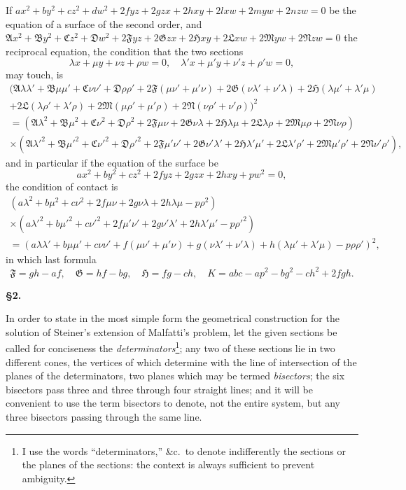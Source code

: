 \documentclass[11pt,a4paper]{book}
\begin{document}
If $ax^2+by^2+cz^2+dw^2+2fyz+2gzx+2hxy+2lxw+2myw+2nzw=0$ be the equation of a surface of the second order, and $\mathfrak{A}x^2+\mathfrak{B}y^2+\mathfrak{C}z^2+\mathfrak{D}w^2+2\mathfrak{F}yz+2\mathfrak{G}zx+2\mathfrak{H}xy+2\mathfrak{L}xw+2\mathfrak{M}yw+2\mathfrak{N}zw=0$ the reciprocal equation, the condition that the two sections
\[
\lambda x + \mu y + \nu z + \rho w = 0, \quad \lambda' x + \mu' y + \nu' z + \rho' w = 0,
\]
may touch, is
\begin{multline*}
(\mathfrak{A}\lambda\lambda' + \mathfrak{B}\mu\mu' + \mathfrak{C}\nu\nu' + \mathfrak{D}\rho\rho' + 2\mathfrak{F}(\mu\nu'+\mu'\nu) + 2\mathfrak{G}(\nu\lambda'+\nu'\lambda) + 2\mathfrak{H}(\lambda\mu'+\lambda'\mu) \\
+ 2\mathfrak{L}(\lambda\rho'+\lambda'\rho) + 2\mathfrak{M}(\mu\rho'+\mu'\rho) + 2\mathfrak{N}(\nu\rho'+\nu'\rho))^2 \\
= (\mathfrak{A}\lambda^2 + \mathfrak{B}\mu^2 + \mathfrak{C}\nu^2 + \mathfrak{D}\rho^2 + 2\mathfrak{F}\mu\nu + 2\mathfrak{G}\nu\lambda + 2\mathfrak{H}\lambda\mu + 2\mathfrak{L}\lambda\rho + 2\mathfrak{M}\mu\rho + 2\mathfrak{N}\nu\rho) \\
\times (\mathfrak{A}\lambda'^2 + \mathfrak{B}\mu'^2 + \mathfrak{C}\nu'^2 + \mathfrak{D}\rho'^2 + 2\mathfrak{F}\mu'\nu' + 2\mathfrak{G}\nu'\lambda' + 2\mathfrak{H}\lambda'\mu' + 2\mathfrak{L}\lambda'\rho' + 2\mathfrak{M}\mu'\rho' + 2\mathfrak{N}\nu'\rho'),
\end{multline*}
and in particular if the equation of the surface be
\[
ax^2 + by^2 + cz^2 + 2fyz + 2gzx + 2hxy + pw^2 = 0,
\]
the condition of contact is
\begin{multline*}
(a\lambda^2 + b\mu^2 + c\nu^2 + 2f\mu\nu + 2g\nu\lambda + 2h\lambda\mu - p\rho^2) \\
\times (a\lambda'^2 + b\mu'^2 + c\nu'^2 + 2f\mu'\nu' + 2g\nu'\lambda' + 2h\lambda'\mu' - p\rho'^2) \\
= (a\lambda\lambda' + b\mu\mu' + c\nu\nu' + f(\mu\nu'+\mu'\nu) + g(\nu\lambda'+\nu'\lambda) + h(\lambda\mu'+\lambda'\mu) - p\rho\rho')^2,
\end{multline*}
in which last formula
\[
\mathfrak{F} = gh-af, \quad \mathfrak{G} = hf-bg, \quad \mathfrak{H} = fg-ch, \quad K = abc-ap^2-bg^2-ch^2+2fgh.
\]

\newpage
\setcounter{page}{59}

\noindent\textbf{\S 2.}

In order to state in the most simple form the geometrical construction for the solution of Steiner's extension of Malfatti's problem, let the given sections be called for conciseness the \textit{determinators}\footnote{I use the words ``determinators,'' \&c.\ to denote indifferently the sections or the planes of the sections: the context is always sufficient to prevent ambiguity.}; any two of these sections lie in two different cones, the vertices of which determine with the line of intersection of the planes of the determinators, two planes which may be termed \textit{bisectors}; the six bisectors pass three and three through four straight lines; and it will be convenient to use the term bisectors to denote, not the entire system, but any three bisectors passing through the same line.
\end{document}
